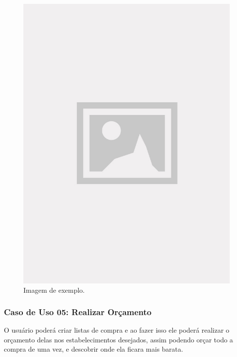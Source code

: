 \begin{figure}[!htb]
\centering
\caption{Imagem de exemplo.}
\includegraphics[width=\linewidth]{figuras/placeholder.jpg}
\end{figure}

\subsubsection{Caso de Uso 05: Realizar Orçamento}

O usuário poderá criar listas de compra e ao fazer isso ele poderá realizar o orçamento delas nos estabelecimentos desejados, assim podendo orçar todo a compra de uma vez, e descobrir onde ela ficara mais barata.

